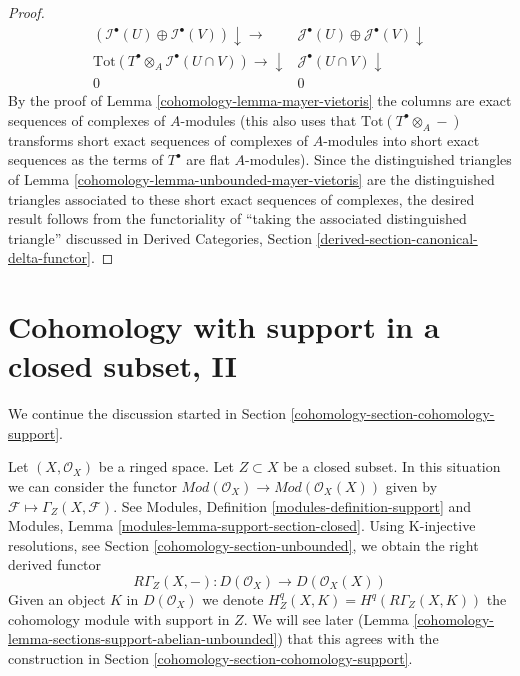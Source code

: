 \begin{proof}
$$\begin{array}{cc}
(\mathcal{I}^\bullet(U) \oplus \mathcal{I}^\bullet(V)) \downarrow\longrightarrow & \mathcal{J}^\bullet(U) \oplus \mathcal{J}^\bullet(V) \downarrow \\ \text{Tot}(T^\bullet \otimes_A \mathcal{I}^\bullet(U \cap V)) \longrightarrow\downarrow & \mathcal{J}^\bullet(U \cap V) \downarrow \\ 0 & 0\end{array}
$$
By the proof of Lemma \ref{cohomology-lemma-mayer-vietoris} the columns are
exact sequences of complexes of $A$-modules (this also uses that
$\text{Tot}(T^\bullet \otimes_A -)$ transforms short exact sequences
of complexes of $A$-modules into short exact sequences as the terms
of $T^\bullet$ are flat $A$-modules). Since the distinguished triangles
of Lemma \ref{cohomology-lemma-unbounded-mayer-vietoris}
are the distinguished triangles associated to these
short exact sequences of complexes, the desired result follows from
the functoriality of ``taking the associated distinguished triangle''
discussed in
Derived Categories, Section \ref{derived-section-canonical-delta-functor}.
\end{proof}

\section{Cohomology with support in a closed subset, II}
\label{cohomology-section-cohomology-support-bis}
We continue the discussion started in
Section \ref{cohomology-section-cohomology-support}.

\medskip\noindent
Let $(X, \mathcal{O}_X)$ be a ringed space. Let $Z \subset X$ be
a closed subset. In this situation we can consider the functor
$\textit{Mod}(\mathcal{O}_X) \to \textit{Mod}(\mathcal{O}_X(X))$
given by $\mathcal{F} \mapsto \Gamma_Z(X, \mathcal{F})$. See
Modules, Definition \ref{modules-definition-support}
and
Modules, Lemma \ref{modules-lemma-support-section-closed}.
Using K-injective resolutions, see Section \ref{cohomology-section-unbounded},
we obtain the right derived functor
$$
R\Gamma_Z(X, - ) : D(\mathcal{O}_X) \to D(\mathcal{O}_X(X))
$$
Given an object $K$ in $D(\mathcal{O}_X)$ we denote
$H^q_Z(X, K) = H^q(R\Gamma_Z(X, K))$ the cohomology module with
support in $Z$. We will see later
(Lemma \ref{cohomology-lemma-sections-support-abelian-unbounded}) that this
agrees with the construction in Section \ref{cohomology-section-cohomology-support}.

